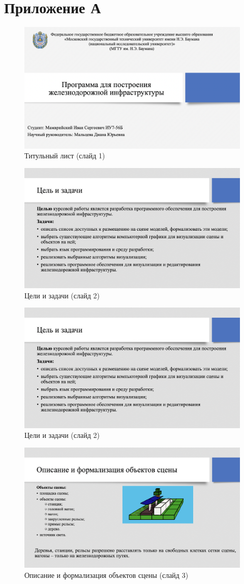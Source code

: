 \chapter*{Приложение А}

\begin{figure}[h]
    \centering
    \includegraphics[width=0.5\linewidth]{img/title.png}
    \caption{Титульный лист (слайд 1)}
    \label{img:title}
\end{figure}
\noindent

\begin{figure}[h]
    \centering
    \includegraphics[width=0.5\linewidth]{img/celtask.png}
    \caption{Цели и задачи (слайд 2)}
    \label{img:celtask}
\end{figure}
\noindent

\begin{figure}[h]
    \centering
    \includegraphics[width=0.5\linewidth]{img/celtask.png}
    \caption{Цели и задачи (слайд 2)}
    \label{img:celtask}
\end{figure}
\noindent

\begin{figure}[h]
    \centering
    \includegraphics[width=0.5\linewidth]{img/form.png}
    \caption{Описание и формализация объектов сцены (слайд 3)}
    \label{img:form}
\end{figure}
\noindent

